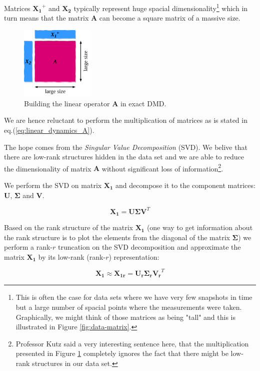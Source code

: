 \documentclass[10pt,twocolumn]{article}
\begin{document}
Matrices $\bm{X_1}^{+}$ and $\bm{X_2}$ typically represent huge spacial dimensionality\footnote{This is often the case for data sets where we have very few snapshots in time but a large number of spacial points where the measurements were taken. Graphically, we might think of those matrices as being "tall" and this is illustrated in Figure \ref{fig:data-matrix}.} which in turn means that the matrix $\bm{A}$ can become a square matrix of a massive size. 

\begin{figure}
\centering\includegraphics[width=3.5cm]{getting-A.png}
\caption{Building the linear operator $\bm{A}$ in exact DMD.}
\label{fig:building-A}
\end{figure}

We are hence reluctant to perform the multiplication of matrices as is stated in eq.(\ref{eq:linear_dynamics_A}). 

The hope comes from the \textit{Singular Value Decomposition} (SVD). We belive that there are low-rank structures hidden in the data set and we are able to reduce the dimensionality of matrix $\bm{A}$ without significant loss of information\footnote{Professor Kutz said a very interesting sentence here, that the multiplication presented in Figure \ref{fig:building-A} completely ignores the fact that there might be low-rank structures in our data set.}.

We perform the SVD on matrix $\bm{X_1}$ and decompose it to the component matrices: $\bm{U}$, $\bm{\Sigma}$ and $\bm{V}$.

\begin{equation} \label{eq:solution}
\bm{X_1} = \bm{U} \bm{\Sigma} \bm{V}^T 
\end{equation}

Based on the rank structure of the matrix $\bm{X_1}$ (one way to get information about the rank structure is to plot the elements from the diagonal of the matrix $\bm{\Sigma}$) we perform a rank-$r$ truncation on the SVD decomposition and approximate the matrix $\bm{X_1}$ by its low-rank (rank-$r$) representation:

\begin{equation} \label{eq:solution-approx}
\bm{X_1} \approx \bm{X_{1r}} = \bm{U_r} \bm{\Sigma_r} \bm{V_r}^T 
\end{equation}
\end{document}
